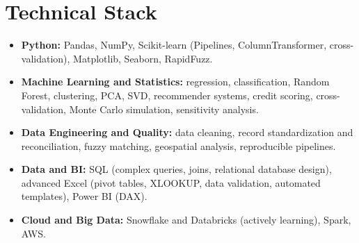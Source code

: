 \documentclass[10pt]{article}
\begin{document}
\section*{Technical Stack}
\begin{itemize}
\item \textbf{Python:} Pandas, NumPy, Scikit-learn (Pipelines, ColumnTransformer, cross-validation), Matplotlib, Seaborn, RapidFuzz.
\item \textbf{Machine Learning and Statistics:} regression, classification, Random Forest, clustering, PCA, SVD, recommender systems, credit scoring, cross-validation, Monte Carlo simulation, sensitivity analysis.
\item \textbf{Data Engineering and Quality:} data cleaning, record standardization and reconciliation, fuzzy matching, geospatial analysis, reproducible pipelines.
\item \textbf{Data and BI:} SQL (complex queries, joins, relational database design), advanced Excel (pivot tables, XLOOKUP, data validation, automated templates), Power BI (DAX).
\item \textbf{Cloud and Big Data:} Snowflake and Databricks (actively learning), Spark, AWS.
\end{itemize}
\end{document}
